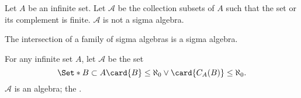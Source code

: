 \begin{expl}
  Let $A$ be an infinite set.
  Let $\mathcal{A}$ be the collection
  subsets of $A$ such that the set or its
  complement is finite.
  $\mathcal{A}$ is not a sigma algebra.
\end{expl}


\begin{prop}
  The intersection of a family of sigma algebras is
  a sigma algebra.
  \label{sigma_algebra:sigmaintersection}
\end{prop}

\begin{expl}
  For any infinite set $A$,
  let $\mathcal{A}$ be the set
  $$
  \Set*{
    B \subset A
  }{
    \card{B} \leq \aleph_0 \lor
    \card{C_{A}(B)} \leq \aleph_0
  }.
  $$
  $\mathcal{A}$ is an algebra;
  the
  .
\end{expl}


\strats
